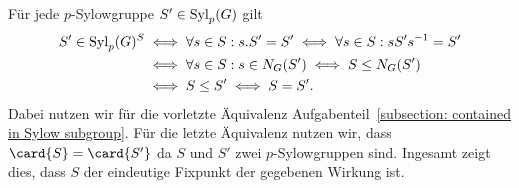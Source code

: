 Für jede $p$-Sylowgruppe $S' \in \Sylow{p}{G}$ gilt
\begin{align*}
        S' \in \Sylow{p}{G}^S
  &\iff \forall s \in S: s.S' = S'
   \iff \forall s \in S: s S' s^{-1} = S'
  \\
  &\iff \forall s \in S: s \in \normalizer{S'}{G}
   \iff S \subgroup \normalizer{S'}{G}
  \\
  &\iff S \subgroup S'
   \iff S = S'.
\end{align*}
Dabei nutzen wir für die vorletzte Äquivalenz Aufgabenteil~\ref{subsection: contained in Sylow subgroup}.
Für die letzte Äquivalenz nutzen wir, dass $\card{S} = \card{S'}$ da $S$ und $S'$ zwei $p$-Sylowgruppen sind.
Ingesamt zeigt dies, dass $S$ der eindeutige Fixpunkt der gegebenen Wirkung ist.





\addtocounter{subsection}{1}





\addtocounter{subsection}{1}
